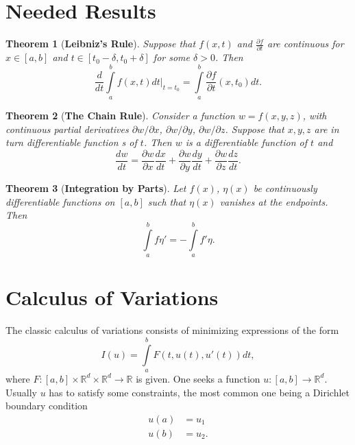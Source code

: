 \documentclass{article}
\newtheorem{theorem}{Theorem}[section]
\theoremstyle{definition}
\theoremstyle{remark}
\theoremstyle{definition}
\begin{document}
\section{Needed Results}
    \begin{theorem}[\textbf{Leibniz's Rule}]
        Suppose that $f(x,t)$ and $\frac{\partial f}{\partial t}$ are continuous for $x\in[a,b]$ and $t\in[t_0-\delta,t_0+\delta]$ for some $\delta>0$. Then 
            \begin{equation*}
                \frac{d}{dt}\int\limits_a^b f(x,t)dt\biggr\rvert_{t=t_0}=\int\limits_a^b\frac{\partial f}{\partial t}(x,t_0)dt.
            \end{equation*}
    \end{theorem}
    
    \begin{theorem}[\textbf{The Chain Rule}]
        Consider a function $w=f(x,y,z)$, with continuous partial derivatives $\partial w/\partial x$, $\partial w/\partial y$, $\partial w/\partial z$. Suppose that $x, y, z$ are in turn differentiable function s of $t$. Then $w$ is a differentiable function of $t$ and 
            \begin{equation*}
                \frac{dw}{dt}=\frac{\partial w}{\partial x}\frac{dx}{dt}+\frac{\partial w}{\partial y}\frac{dy}{dt}+\frac{\partial w}{\partial z}\frac{dz}{dt}.
            \end{equation*}
    \end{theorem}
    
    \begin{theorem}[\textbf{Integration by Parts}]
        Let $f(x)$, $\eta(x)$ be continuously differentiable functions on $[a,b]$ such that $\eta(x)$ vanishes at the endpoints. Then 
            \begin{equation*}
                \int\limits_a^b f\eta'=-\int\limits_a^b f'\eta.
            \end{equation*}
    \end{theorem}
    
\section{Calculus of Variations}
    The classic calculus of variations consists of minimizing expressions of the form
        \begin{equation*}
            I(u)=\int\limits_a^b F(t,u(t),u'(t))dt,
        \end{equation*}
    where $F\colon[a,b]\times\mathbb{R}^d\times\mathbb{R}^d\rightarrow\mathbb{R}$ is given. One seeks a function $u\colon[a,b]\rightarrow\mathbb{R}^d$. Usually $u$ has to satisfy some constraints, the most common one being a Dirichlet boundary condition
        \begin{equation*}
            \begin{split}
                u(a)&=u_1 \\
                u(b)&=u_2.
            \end{split}
        \end{equation*}
        
\end{document}
